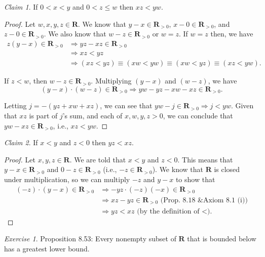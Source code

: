 \documentclass[12pt,oneside]{amsart}
\theoremstyle{remark}
\newtheorem{exer}{Exercise}
\newtheorem{claim}{Claim}[exer]
\newcommand{\bfR}{\mathbf{R}}
\begin{document}
\begin{claim}
If $0 < x < y$ and $0 < z \leq w$ then $xz < yw$.
\end{claim}
\begin{proof}
Let $w,x,y,z \in \bfR$. We know that $y - x \in \bfR_{>0}$, $x - 0 \in \bfR_{>0}$, and $z - 0 \in \bfR_{>0}$. We also know that $w - z \in \bfR_{>0}$ or $w = z$. If $w = z$ then, we have
\begin{equation}
\begin{split}
z(y - x) \in \bfR_{>0} &\Rightarrow yz - xz \in \bfR_{>0} \\
                       &\Rightarrow xz < yz \\
                       &\Rightarrow (xz < yz) \equiv (xw < yw) \equiv (xw < yz) \equiv (xz < yw).
\end{split}
\end{equation}

If $z < w$, then $w - z \in \bfR_{>0}$. Multiplying $(y - x)$ and $(w - z)$, we have
\[ (y - x) \cdot (w - z) \in \bfR_{>0} \Rightarrow yw - yz - xw - xz \in \bfR_{>0}. \]

Letting $j = -(yz + xw + xz)$, we can see that $yw - j \in \bfR_{>0} \Rightarrow j < yw$. Given that $xz$ is part of $j$'s sum, and each of $x,w,y,z > 0$, we can conclude that $yw - xz \in \bfR_{>0}$, i.e., $xz < yw$.
\end{proof}

\begin{claim}
If $x < y$ and $z < 0$ then $yz < xz$.
\end{claim}
\begin{proof}
Let $x,y,z \in \bfR$. We are told that $x < y$ and $z < 0$. This means that $y - x \in \bfR_{>0}$ and $0 - z \in \bfR_{>0}$ (i.e., $-z \in \bfR_{>0}$). We know that $\bfR$ is closed under multiplication, so we can multiply $-z$ and $y - x$ to show that
\begin{equation}
\begin{split}
(-z) \cdot (y - x) \in \bfR_{>0} &\Rightarrow -yz \cdot (-z)(-x) \in \bfR_{>0} \\
                                 &\Rightarrow xz - yz \in \bfR_{>0} \text{ (Prop. 8.18 \& Axiom 8.1 (i))} \\
                                 &\Rightarrow yz < xz \text{ (by the definition of <).}
\end{split}
\end{equation}
\end{proof}

%
%
%
%
\newpage
\begin{exer}
Proposition 8.53: Every nonempty subset of $\bfR$ that is bounded below has a greatest lower bound. %
\end{exer}
\end{document}
